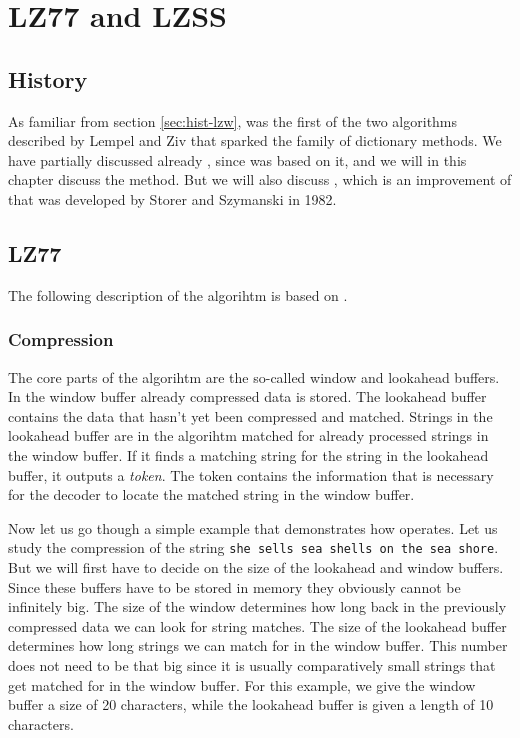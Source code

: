 \begin{comment}
  
\end{comment}

\chapter{LZ77 and LZSS}
\label{cha:lz77-lzss}

\section{History}

As familiar from section \ref{sec:hist-lzw}, \lzone was the first of the
two algorithms described by Lempel and Ziv that sparked the family of
dictionary methods. We have partially discussed already \lztwo, since
\lzw was based on it, and we will in this chapter discuss the \lzone
method. But we will also discuss \lzss, which is an improvement of \lzone
that was developed by Storer and Szymanski in 1982.

\section{LZ77}

The following description of the \lzone algorihtm is based on
\cite{Salomon:2004:DCC,mark1996data_compression_book,mcfadden92:_hackin_data_compr_ziv_lempel}.

\subsection{Compression}

The core parts of the \lzone algorihtm are the so-called window and
lookahead buffers. In the window buffer already compressed data is
stored. The lookahead buffer contains the data that hasn't yet been
compressed and matched. Strings in the lookahead buffer are in the
algorihtm matched for already processed strings in the window
buffer. If it finds a matching string for the string in the lookahead
buffer, it outputs a \textit{token}. The token contains the
information that is necessary for the decoder to locate the matched
string in the window buffer.

Now let us go though a simple example that demonstrates how \lzone
operates. Let us study the \lzone compression of the string \texttt{she
  sells sea shells on the sea shore}. But we will first have to decide
on the size of the lookahead and window buffers. Since these buffers
have to be stored in memory they obviously cannot be infinitely
big. The size of the window determines how long back in the previously
compressed data we can look for string matches. The size of the
lookahead buffer determines how long strings we can match for in the
window buffer. This number does not need to be that big since it is
usually comparatively small strings that get matched for in the window
buffer. For this example, we give the window buffer a size of 20
characters, while the lookahead buffer is given a length of 10
characters.

